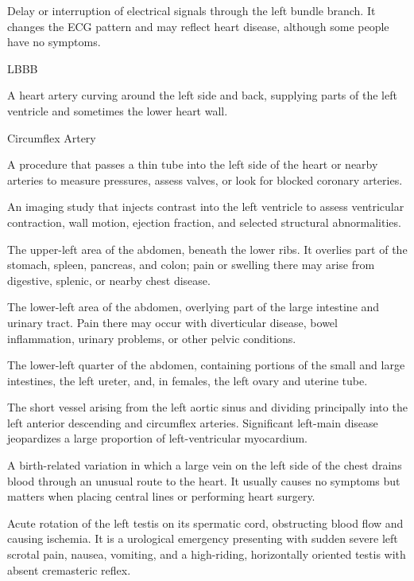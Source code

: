  Delay or interruption of electrical signals through the left bundle branch. It changes the ECG pattern and may reflect heart disease, although some people have no symptoms.

\synonyms
LBBB

 A heart artery curving around the left side and back, supplying parts of the left ventricle and sometimes the lower heart wall.

\synonyms
Circumflex Artery

 A procedure that passes a thin tube into the left side of the heart or nearby arteries to measure pressures, assess valves, or look for blocked coronary arteries.

 An imaging study that injects contrast into the left ventricle to assess ventricular contraction, wall motion, ejection fraction, and selected structural abnormalities.

 The upper-left area of the abdomen, beneath the lower ribs. It overlies part of the stomach, spleen, pancreas, and colon; pain or swelling there may arise from digestive, splenic, or nearby chest disease.

 The lower-left area of the abdomen, overlying part of the large intestine and urinary tract. Pain there may occur with diverticular disease, bowel inflammation, urinary problems, or other pelvic conditions.

 The lower-left quarter of the abdomen, containing portions of the small and large intestines, the left ureter, and, in females, the left ovary and uterine tube.

 The short vessel arising from the left aortic sinus and dividing principally into the
left anterior descending and circumflex arteries. Significant left-main disease
jeopardizes a large proportion of left-ventricular myocardium.

 A birth-related variation in which a large vein on the left side of the chest drains blood through an unusual route to the heart. It usually causes no symptoms but matters when placing central lines or performing heart surgery.

 Acute rotation of the left testis on its spermatic cord, obstructing blood flow and
causing ischemia. It is a urological emergency presenting with sudden severe left
scrotal pain, nausea, vomiting, and a high-riding, horizontally oriented testis with
absent cremasteric reflex.

